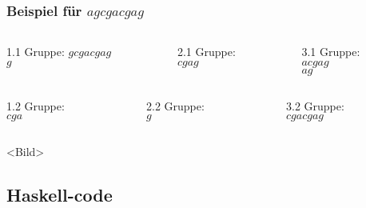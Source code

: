 \documentclass{beamer}
\begin{document}
\begin{frame}[t]
\frametitle{Beispiel für $agcgacgag$}
\begin{columns}
    \begin{column}[t]{0.3\textwidth}
        1.1 Gruppe:  
        $gcgacgag$ \\  
        $g$        \\  
    \end{column}
    \begin{column}[t]{0.3\textwidth}
        2.1 Gruppe: \\
        $cgag$      \\
    \end{column}
    \begin{column}[t]{0.3\textwidth}
        3.1 Gruppe: \\
        $acgag$     \\
        $ag$        \\
    \end{column}
\end{columns}
\medskip
\begin{columns}
    \begin{column}[t]{0.3\textwidth}
        1.2 Gruppe:\\
        $cga$      \\  
    \end{column}
    \begin{column}[t]{0.3\textwidth}
        2.2 Gruppe: \\
        $g$         \\
    \end{column}
    \begin{column}[t]{0.3\textwidth}
        3.2 Gruppe: \\
        $cgacgag$   \\
    \end{column}
\end{columns}
\medskip
<Bild>
\end{frame}


\subsection{Haskell-code}

\end{document}
